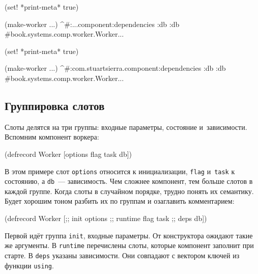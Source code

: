 \ifnarrow

\begin{english}
  \begin{clojure}
(set! *print-meta* true)

(make-worker {...})
^#:...component{:dependencies {:db :db}}
#book.systems.comp.worker.Worker{...}
  \end{clojure}
\end{english}

\else

\begin{english}
  \begin{clojure}
(set! *print-meta* true)

(make-worker {...})
^#:com.stuartsierra.component{:dependencies {:db :db}}
#book.systems.comp.worker.Worker{...}
  \end{clojure}
\end{english}

\fi

\subsection{Группировка слотов}


Слоты делятся на три группы: входные параметры, состояние
и~зависимости. Вспомним компонент воркера:

\begin{english}
  \begin{clojure}
(defrecord Worker
    [options flag task db])
  \end{clojure}
\end{english}

В этом примере слот \verb|options| относится к инициализации, \verb|flag|
и~\verb|task| к состоянию, а \verb|db|~--- зависимость. Чем сложнее компонент,
тем больше слотов в каждой группе. Когда слоты в случайном порядке, трудно
понять их семантику. Будет хорошим тоном разбить их по группам и озаглавить
комментарием:

\begin{english}
  \begin{clojure}
(defrecord Worker
    [;; init
     options
     ;; runtime
     flag
     task
     ;; deps
     db])
  \end{clojure}
\end{english}

Первой идёт группа \verb|init|, входные параметры. От конструктора ожидают
такие же аргументы. В \verb|runtime| перечислены слоты, которые компонент
заполнит при старте. В \verb|deps| указаны зависимости. Они совпадают с
вектором ключей из функции \verb|using|.

